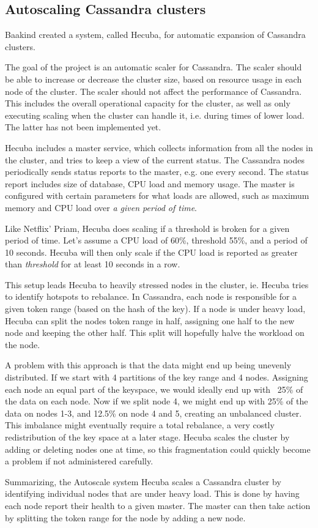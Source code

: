 \subsection{Autoscaling Cassandra clusters}

Baakind\cite{baakind} created a system, called Hecuba, for automatic expansion of Cassandra clusters.

The goal of the project is an automatic scaler for Cassandra. The scaler should be able to increase or decrease the cluster size, based on resource usage in each node of the cluster.
The scaler should not affect the performance of Cassandra. This includes the overall operational capacity for the cluster, as well as only executing scaling when the cluster can handle it, i.e. during times of lower load. The latter has not been implemented yet.

Hecuba includes a master service, which collects information from all the nodes in the cluster, and tries to keep a view of the current status. The Cassandra nodes periodically sends status reports to the master, e.g. one every second. The status report includes size of database, CPU load and memory usage. The master is configured with certain parameters for what loads are allowed, such as maximum memory and CPU load over \emph{a given period of time}.

Like Netflix' Priam, Hecuba does scaling if a threshold is broken for a given period of time. Let's assume a CPU load of 60\%, threshold 55\%, and a period of 10 seconds. Hecuba will then only scale if the CPU load is reported as greater than \emph{threshold} for at least 10 seconds in a row.

This setup leads Hecuba to heavily stressed nodes in the cluster, ie. Hecuba tries to identify hotspots to rebalance. 
In Cassandra, each node is responsible for a given token range (based on the hash of the key). If a node is under heavy load, Hecuba can split the nodes token range in half, assigning one half to the new node and keeping the other half. This split will hopefully halve the workload on the node.

A problem with this approach is that the data might end up being unevenly distributed. If we start with 4 partitions of the key range and 4 nodes. Assigning each node an equal part of the keyspace, we would ideally end up with ~25\% of the data on each node. Now if we split node 4, we might end up with 25\% of the data on nodes 1-3, and 12.5\% on node 4 and 5, creating an unbalanced cluster. This imbalance might eventually require a total rebalance, a very costly redistribution of the key space at a later stage. Hecuba scales the cluster by adding or deleting nodes one at time, so this fragmentation could quickly become a problem if not administered carefully.

Summarizing, the Autoscale system Hecuba scales a Cassandra cluster by identifying individual nodes that are under heavy load. This is done by having each node report their health to a given master. The master can then take action by splitting the token range for the node by adding a new node.




